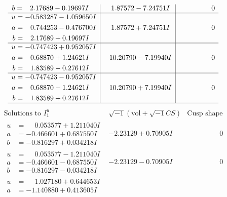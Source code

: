 \documentclass[1p]{elsarticle_modified}
\theoremstyle{definition}
\newcommand{\I}{\sqrt{-1}}
\begin{document}
$$\begin{array}{c|c|c}
\begin{aligned}
b &= \phantom{-}2.17689 - 0.19697 I\end{aligned}
 & \phantom{-}1.87572 - 7.24751 I & \phantom{-0.000000 } 0 \\ \hline\begin{aligned}
u &= -0.583287 - 1.059650 I \\
a &= \phantom{-}0.744253 - 0.476700 I \\
b &= \phantom{-}2.17689 + 0.19697 I\end{aligned}
 & \phantom{-}1.87572 + 7.24751 I & \phantom{-0.000000 } 0 \\ \hline\begin{aligned}
u &= -0.747423 + 0.952057 I \\
a &= \phantom{-}0.68870 + 1.24621 I \\
b &= \phantom{-}1.83589 - 0.27612 I\end{aligned}
 & \phantom{-}10.20790 - 7.19940 I & \phantom{-0.000000 } 0 \\ \hline\begin{aligned}
u &= -0.747423 - 0.952057 I \\
a &= \phantom{-}0.68870 - 1.24621 I \\
b &= \phantom{-}1.83589 + 0.27612 I\end{aligned}
 & \phantom{-}10.20790 + 7.19940 I & \phantom{-0.000000 } 0\\
 \hline 
 \end{array}$$\newpage$$\begin{array}{c|c|c}  
\text{Solutions to }I^u_{1}& \I (\text{vol} + \sqrt{-1}CS) & \text{Cusp shape}\\
 \hline 
\begin{aligned}
u &= \phantom{-}0.053577 + 1.211040 I \\
a &= -0.466601 + 0.687550 I \\
b &= -0.816297 + 0.034218 I\end{aligned}
 & -2.23129 + 0.70905 I & \phantom{-0.000000 } 0 \\ \hline\begin{aligned}
u &= \phantom{-}0.053577 - 1.211040 I \\
a &= -0.466601 - 0.687550 I \\
b &= -0.816297 - 0.034218 I\end{aligned}
 & -2.23129 - 0.70905 I & \phantom{-0.000000 } 0 \\ \hline\begin{aligned}
u &= \phantom{-}1.027180 + 0.644653 I \\
a &= -1.140880 + 0.413605 I \\

\end{aligned}
\end{array}$$
\end{document}
